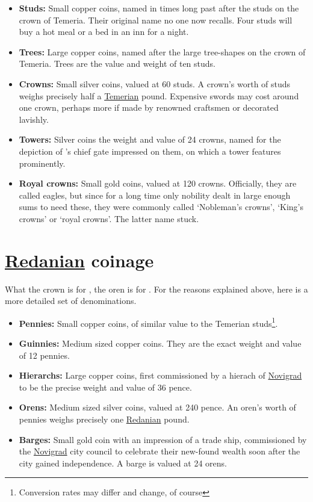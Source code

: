 \documentclass[parskip=full,11pt]{scrreport}
\begin{document}
\begin{itemize}
	\item \textbf{Studs:} Small copper coins, named in times long past after the studs on the crown of Temeria. 
		  Their original name no one now recalls. Four studs will buy a hot meal or a bed in an inn for a night.
	\item \textbf{Trees:} Large copper coins, named after the large tree-shapes on the crown of Temeria. Trees are
		  the value and weight of ten studs.
	\item \textbf{Crowns:} Small silver coins, valued at 60 studs. A crown's worth of studs weighs precisely half
		  a \hyperref[realm:temeria]{Temerian} pound. Expensive swords may cost around one crown, perhaps more if made by renowned craftsmen or decorated lavishly.
	\item \textbf{Towers:} Silver coins the weight and value of 24 crowns, named for the depiction of 's 
		  chief gate impressed on them, on which a tower features prominently.
	\item \textbf{Royal crowns:} Small gold coins, valued at 120 crowns. Officially, they are called eagles, but since for
		  a long time only nobility dealt in large enough sums to need these, they were commonly called  `Nobleman's crowns',
		  `King's crowns' or `royal crowns'. The latter name stuck.
\end{itemize}

\section{\hyperref[realm:redania]{Redanian} coinage}
What the crown is for , the oren is for . For the reasons explained above,
here is a more detailed set of denominations.

\begin{itemize}
	\item \textbf{Pennies:} Small copper coins, of similar value to the Temerian studs\footnote{Conversion rates may differ and change, of course}.
	\item \textbf{Guinnies:} Medium sized copper coins. They are the exact weight and value of 12 pennies.
	\item \textbf{Hierarchs:} Large copper coins, first commissioned by a hierach of \hyperref[city:novigrad]{Novigrad} to
		  be the precise weight and value of 36 pence.
	\item \textbf{Orens:} Medium sized silver coins, valued at 240 pence. An oren's worth of pennies weighs precisely one
	      \hyperref[realm:redania]{Redanian} pound.
	\item \textbf{Barges:} Small gold coin with an impression of a trade ship, commissioned by the \hyperref[city:novigrad]{Novigrad}
		  city council to celebrate their new-found wealth soon after the city gained independence. A barge is valued at 24 orens.
\end{itemize}
\end{document}

